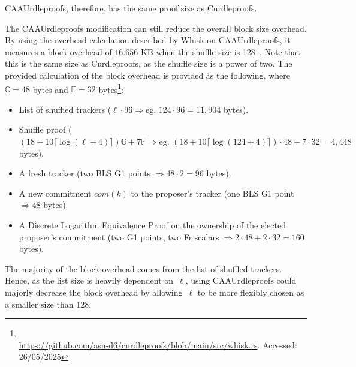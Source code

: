 CAAUrdleproofs, therefore, has the same proof size as Curdleproofs.

The CAAUrdleproofs modification can still reduce the overall block size overhead.
By using the overhead calculation described by Whisk on CAAUrdleproofs, it measures a block overhead of $16.656$ KB when the shuffle size is 128~\cite{Whisk2024}.
Note that this is the same size as Curdleproofs, as the shuffle size is a power of two.
The provided calculation of the block overhead is provided as the following, where $\mathbb{G}=48$ bytes and $\mathbb{F}=32$ bytes\footnote{\\ \href{https://github.com/asn-d6/curdleproofs/blob/main/src/whisk.rs}{https://github.com/asn-d6/curdleproofs/blob/main/src/whisk.rs}. Accessed: 26/05/2025}:
\begin{itemize}
    \item List of shuffled trackers ($\ell\cdot96\Rightarrow\text{eg. }124\cdot96=11,904$ bytes).
    \item Shuffle proof ($(18+10 \lceil\log(\ell+4)\rceil)\mathbb{G}+7\mathbb{F}\Rightarrow\text{eg. }(18+10\lceil\log(124+4)\rceil)\cdot48+7\cdot32=4,448$ bytes).
    \item A fresh tracker (two BLS G1 points $\Rightarrow48\cdot2=96$ bytes).
    \item A new commitment $com(k)$ to the proposer's tracker (one BLS G1 point $\Rightarrow48$ bytes).
    \item A Discrete Logarithm Equivalence Proof on the ownership of the elected proposer's commitment (two G1 points, two Fr scalars $\Rightarrow2\cdot48+2\cdot32=160$ bytes).
\end{itemize}
The majority of the block overhead comes from the list of shuffled trackers.
Hence, as the list size is heavily dependent on~$\ell$, using CAAUrdleproofs could majorly decrease the block overhead by allowing~$\ell$ to be more flexibly chosen as a smaller size than 128.